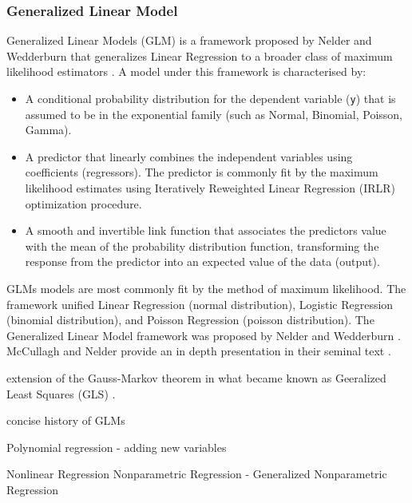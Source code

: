 \begin{bibunit}



\subsubsection{Generalized Linear Model}
Generalized Linear Models (GLM) is a framework proposed by Nelder and Wedderburn that generalizes Linear Regression to a broader class of maximum likelihood estimators \cite{Nelder1972}. A model under this framework is characterised by:

\begin{itemize}
	\item A conditional probability distribution for the dependent variable (\texttt{y}) that is assumed to be in the exponential family (such as Normal, Binomial, Poisson, Gamma).
	\item A predictor that linearly combines the independent variables using coefficients (regressors). The predictor is commonly fit by the maximum likelihood estimates using Iteratively Reweighted Linear Regression (IRLR) optimization procedure.
	\item A smooth and invertible link function that associates the predictors value with the mean of the probability distribution function, transforming the response from the predictor into an expected value of the data (output).
\end{itemize}

 GLMs models are most commonly fit by the method of maximum likelihood. 
The framework unified Linear Regression (normal distribution), Logistic Regression (binomial distribution), and Poisson Regression (poisson distribution). The Generalized Linear Model framework was proposed by Nelder and Wedderburn \cite{Nelder1972}. McCullagh and Nelder provide an in depth presentation in their seminal text \cite{McCullagh1989}.

extension of the Gauss-Markov theorem in what became known as Geeralized Least Squares (GLS) \cite{Aitken1935}.

concise history of GLMs \cite{McCulloch2000}


Polynomial regression - adding new variables


Nonlinear Regression
Nonparametric Regression - Generalized Nonparametric Regression


\end{bibunit}
